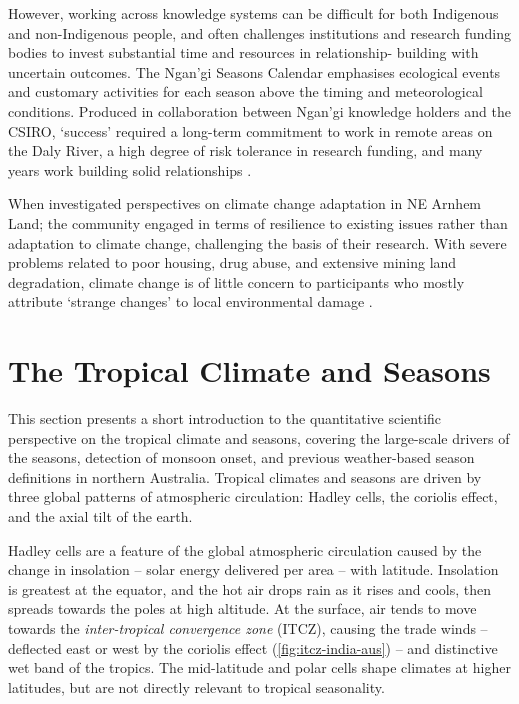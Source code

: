 However, working across knowledge systems can be difficult for both Indigenous
and non-Indigenous people, and often challenges institutions and research
funding bodies to invest substantial time and resources in relationship-
building with uncertain outcomes.  The Ngan'gi Seasons Calendar emphasises
ecological events and customary activities for each season above the timing and
meteorological conditions.  Produced in collaboration between Ngan'gi knowledge
holders and the CSIRO, `success' required a long-term commitment to work in
remote areas on the Daly River, a high degree of risk tolerance in
research funding, and many years work building solid relationships \citep{woodward2010}.


When \citet{petheram2010} investigated perspectives on climate change
adaptation in NE Arnhem Land; the community engaged in terms of resilience to
existing issues rather than adaptation to climate change, challenging the basis
of their research.  With severe problems related to poor housing, drug abuse,
and extensive mining land degradation, climate change is of little concern to
participants who mostly attribute `strange changes' to local environmental
damage \citep{green2010a}.









\section{The Tropical Climate and Seasons}
\label{sec:lit-tropical-climate}


This section presents a short introduction to the quantitative scientific
perspective on the tropical climate and seasons, covering the large-scale
drivers of the seasons, detection of monsoon onset, and previous
weather-based season definitions in northern Australia.
%
Tropical climates and seasons are driven by three global patterns of
atmospheric circulation:  Hadley cells, the coriolis effect, and the axial
tilt of the earth.

Hadley cells are a feature of the global atmospheric circulation
caused by the change in insolation -- solar energy delivered per area --
with latitude.  Insolation is greatest at the equator, and the hot air drops
rain as it rises and cools, then spreads towards the poles at high altitude.
At the surface, air tends to move towards the \textit{inter-tropical
convergence zone} (ITCZ), causing the trade winds -- deflected east or west
by the coriolis effect (\cref{fig:itcz-india-aus}) -- and distinctive wet band
of the tropics.  The mid-latitude and polar cells shape climates at higher
latitudes, but are not directly relevant to tropical seasonality.

